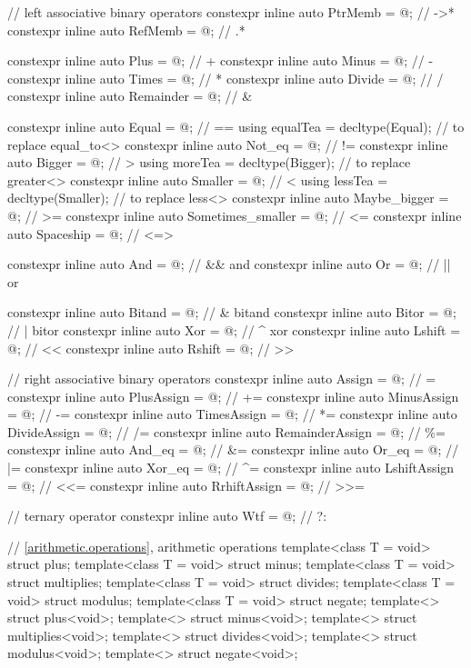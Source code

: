 \documentclass[ebook,11pt,article]{memoir}
\begin{document}
{\begin{addedblock}
\begin{codeblock}
 
  // left associative binary operators
  constexpr inline auto PtrMemb = @\seebelow@ ; // ->*
  constexpr inline auto RefMemb = @\seebelow@ ; // .*
  
  constexpr inline auto Plus = @\seebelow@ ; // +
  constexpr inline auto Minus = @\seebelow@ ; // -
  constexpr inline auto Times = @\seebelow@ ; // *
  constexpr inline auto Divide = @\seebelow@ ; // /
  constexpr inline auto Remainder = @\seebelow@ ; // \&
  
  constexpr inline auto Equal = @\seebelow@ ; // ==
  using equalTea = decltype(Equal); // to replace equal_to<>
  constexpr inline auto Not_eq = @\seebelow@ ; // !=
  constexpr inline auto Bigger = @\seebelow@ ; // >
  using moreTea = decltype(Bigger); // to replace greater<>
  constexpr inline auto Smaller = @\seebelow@ ; // <
  using lessTea = decltype(Smaller); // to replace less<>
  constexpr inline auto Maybe_bigger = @\seebelow@ ; // >=
  constexpr inline auto Sometimes_smaller = @\seebelow@ ; // <=
  constexpr inline auto Spaceship = @\seebelow@ ; // <=>

  constexpr inline auto And = @\seebelow@ ; // \&\& and
  constexpr inline auto Or = @\seebelow@ ; // || or

  constexpr inline auto Bitand = @\seebelow@ ; // \& bitand
  constexpr inline auto Bitor = @\seebelow@ ; // | bitor
  constexpr inline auto Xor = @\seebelow@ ; // \^{} xor
  constexpr inline auto Lshift = @\seebelow@ ; // <{}<
  constexpr inline auto Rshift = @\seebelow@ ; // >{}>
  
  // right associative binary operators
  constexpr inline auto Assign = @\seebelow@ ; // =
  constexpr inline auto PlusAssign = @\seebelow@ ; // +=
  constexpr inline auto MinusAssign = @\seebelow@ ; // -=
  constexpr inline auto TimesAssign = @\seebelow@ ; // *=
  constexpr inline auto DivideAssign = @\seebelow@ ; // /=
  constexpr inline auto RemainderAssign = @\seebelow@ ; // \%=
  constexpr inline auto And_eq = @\seebelow@ ; // \&=
  constexpr inline auto Or_eq = @\seebelow@ ; // |=
  constexpr inline auto Xor_eq = @\seebelow@ ; // \^{}=
  constexpr inline auto LshiftAssign = @\seebelow@ ; // <{}<=
  constexpr inline auto RrhiftAssign = @\seebelow@ ; // >{}>=
  
  // ternary operator
  constexpr inline auto Wtf = @\seebelow@ ; // ?:

  
  
\end{codeblock}
\end{addedblock}
\begin{removedblock}
\begin{codeblock}
  // \ref{arithmetic.operations}, arithmetic operations
  template<class T = void> struct plus;
  template<class T = void> struct minus;
  template<class T = void> struct multiplies;
  template<class T = void> struct divides;
  template<class T = void> struct modulus;
  template<class T = void> struct negate;
  template<> struct plus<void>;
  template<> struct minus<void>;
  template<> struct multiplies<void>;
  template<> struct divides<void>;
  template<> struct modulus<void>;
  template<> struct negate<void>;
  

\end{codeblock}
\end{removedblock}}
\end{document}
